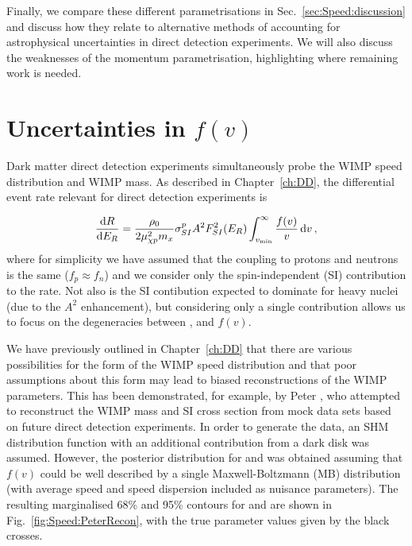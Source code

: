 
Finally, we compare these different parametrisations in Sec.~\ref{sec:Speed:discussion} and discuss how they relate to alternative methods of accounting for astrophysical uncertainties in direct detection experiments. We will also discuss the weaknesses of the momentum parametrisation, highlighting where remaining work is needed. 

\section{Uncertainties in $f(v)$}
\label{sec:Speed:uncertainties}

Dark matter direct detection experiments simultaneously probe the WIMP speed distribution and WIMP mass. As described in Chapter~\ref{ch:DD}, the differential event rate relevant for direct detection experiments is

\begin{equation}
\frac{\mathrm{d}R}{\mathrm{d}E_R} = \frac{\rho_0}{2 \mu_{\chi p}^2 m_x} \sigma_{SI}^p A^2 F_{SI}^2(E_R) \int_{v_\textrm{min}}^\infty \frac{f(v)}{v}\,\mathrm{d}v\,,
\end{equation}
where for simplicity we have assumed that the coupling to protons and neutrons is the same ($f_p \approx f_n$) and we consider only the spin-independent (SI) contribution to the rate. Not also is the SI contibution expected to dominate for heavy nuclei (due to the $A^2$ enhancement), but considering only a single contribution allows us to focus on the degeneracies between \mchi, \sigmapsi and $f(v)$. 

We have previously outlined in Chapter~\ref{ch:DD} that there are various possibilities for the form of the WIMP speed distribution and that poor assumptions about this form may lead to biased reconstructions of the WIMP parameters. This has been demonstrated, for example, by Peter \cite{Peter:2011}, who attempted to reconstruct the WIMP mass and SI cross section from mock data sets based on future direct detection experiments. In order to generate the data, an SHM distribution function with an additional contribution from a dark disk was assumed. However, the posterior distribution for \mchi and \sigmapsi was obtained assuming that $f(v)$ could be well described by a single Maxwell-Boltzmann (MB) distribution (with average speed and speed dispersion included as nuisance parameters). The resulting marginalised 68\% and 95\% contours for \mchi and \sigmapsi are shown in Fig.~\ref{fig:Speed:PeterRecon}, with the true parameter values given by the black crosses.

